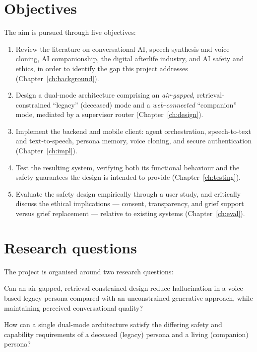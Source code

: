 \documentclass[11pt,a4paper]{report}
\begin{document}
\section{Objectives}
The aim is pursued through five objectives:
\begin{enumerate}[itemsep=2pt]
  \item Review the literature on conversational AI, speech synthesis and voice cloning, AI companionship, the digital afterlife industry, and AI safety and ethics, in order to identify the gap this project addresses (Chapter~\ref{ch:background}).
  \item Design a dual-mode architecture comprising an \emph{air-gapped}, retrieval-constrained ``legacy'' (deceased) mode and a \emph{web-connected} ``companion'' mode, mediated by a supervisor router (Chapter~\ref{ch:design}).
  \item Implement the backend and mobile client: agent orchestration, speech-to-text and text-to-speech, persona memory, voice cloning, and secure authentication (Chapter~\ref{ch:impl}).
  \item Test the resulting system, verifying both its functional behaviour and the safety guarantees the design is intended to provide (Chapter~\ref{ch:testing}).
  \item Evaluate the safety design empirically through a user study, and critically discuss the ethical implications --- consent, transparency, and grief support versus grief replacement --- relative to existing systems (Chapter~\ref{ch:eval}).
\end{enumerate}

\section{Research questions}
The project is organised around two research questions:
\begin{description}[leftmargin=2.2em,style=nextline]
  \item[RQ1.] Can an air-gapped, retrieval-constrained design reduce hallucination in a voice-based legacy persona compared with an unconstrained generative approach, while maintaining perceived conversational quality?
  \item[RQ2.] How can a single dual-mode architecture satisfy the differing safety and capability requirements of a deceased (legacy) persona and a living (companion) persona?
\end{description}
\end{document}
